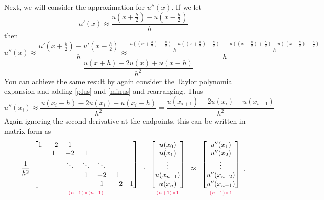\noindent Next, we will consider the approximation for $u''(x)$.
If we let
\[u'(x) \approx \frac{u(x+\frac{h}{2})-u(x-\frac{h}{2})}{h}\]
then
\[u''(x) \approx \frac{u'(x+\frac{h}{2})-u'(x-\frac{h}{2})}{h} \approx \frac{\frac{u((x+\frac{h}{2})+\frac{h}{2})-u((x+\frac{h}{2})-\frac{h}{2})}{h}-\frac{u((x-\frac{h}{2})+\frac{h}{2})-u((x-\frac{h}{2})-\frac{h}{2})}{h}}{h}\]
\[= \frac{u(x+h) - 2u(x) + u(x-h)}{h^2}\]
You can achieve the same result by again consider the Taylor polynomial expansion and adding \eqref{plus} and \eqref{minus} and rearranging.
Thus
\[u''(x_i) \approx \frac{u(x_i+h) - 2u(x_i) + u(x_i-h)}{h^2}= \frac{u(x_{i+1}) - 2u(x_i) + u(x_{i-1})}{h^2}\]
Again ignoring the second derivative at the endpoints, this can be written in matrix form as
\begin{align}
\frac{1}{h^2}
\begin{array}{c}
\begin{bmatrix}
1 & -2 & 1 & \\
& 1 & -2 & 1  \\
& &\ddots &\ddots & \ddots  \\
& & & 1 & -2 & 1 \\
& & & & 1 & -2 & 1
\end{bmatrix}\\
{\scriptstyle\textcolor{red}{(n-1)\times(n+1)}}
\end{array}\cdot
\begin{array}{c}
\begin{bmatrix}
u(x_0) \\ u(x_1)\\ \vdots  \\ u(x_{n-1}) \\ u(x_n)
\end{bmatrix}\\
{\scriptstyle\textcolor{red}{(n+1)\times1}}
\end{array}
 \approx
 \begin{array}{c}
\begin{bmatrix}
u''(x_1) \\ u''(x_2)\\ \vdots  \\ u''(x_{n-2}) \\ u''(x_{n-1})
\end{bmatrix}\\
{\scriptstyle\textcolor{red}{(n-1)\times1}}
\label{finitedifference2:uppp}
\end{array}.
\end{align}

